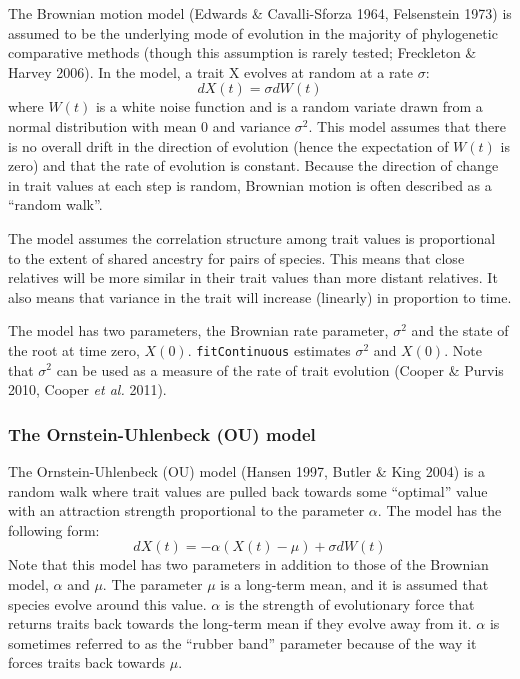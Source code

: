 \documentclass[11pt]{article}
\begin{document}
The Brownian motion model (Edwards \& Cavalli-Sforza 1964, Felsenstein 1973) is assumed to be the underlying mode of evolution in the majority of phylogenetic comparative methods (though this assumption is rarely tested; Freckleton \& Harvey 2006). In the model, a trait X evolves at random at a rate $\sigma$:
\begin{equation}
dX(t) = \sigma dW(t)
\end{equation}
where $W(t)$ is a white noise function and is a random variate drawn from a normal distribution with mean $0$ and variance $\sigma^2$. This model assumes that there is no overall drift in the direction of evolution (hence the expectation of $W(t)$ is zero) and that the rate of evolution is constant. Because the direction of change in trait values at each step is random, Brownian motion is often described as a ``random walk''.


The model assumes the correlation structure among trait values is proportional to the extent of shared ancestry for pairs of species. This means that close relatives will be more similar in their trait values than more distant relatives. It also means that variance in the trait will increase (linearly) in proportion to time. 

The model has two parameters, the Brownian rate parameter, $\sigma^2$ and the state of the root at time zero, $X(0)$. \texttt{fitContinuous} estimates $\sigma^2$ and $X(0)$. Note that $\sigma^2$ can be used as a measure of the rate of trait evolution (Cooper \& Purvis 2010, Cooper \textit{et al.} 2011). 

\subsubsection{The Ornstein-Uhlenbeck (OU) model}
The Ornstein-Uhlenbeck (OU) model (Hansen 1997, Butler \& King 2004) is a random walk where trait values are pulled back towards some ``optimal'' value with an attraction strength proportional to the parameter $\alpha$. The model has the following form:
\begin{equation}
dX(t) = -\alpha(X(t) - \mu) + \sigma dW(t)
\end{equation}
Note that this model has two parameters in addition to those of the Brownian model, $\alpha$ and $\mu$. The parameter $\mu$ is a long-term mean, and it is assumed that species evolve around this value. $\alpha$ is the strength of evolutionary force that returns traits back towards the long-term mean if they evolve away from it. $\alpha$ is sometimes referred to as the ``rubber band'' parameter because of the way it forces traits back towards $\mu$.
\end{document}
